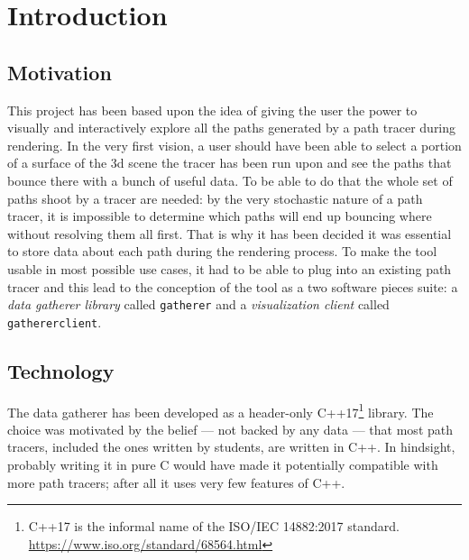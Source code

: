 \chapter{Introduction}

\section{Motivation}
\label{motivation}
This project has been based upon the idea of giving the user the power to visually and interactively explore all the paths generated by a path tracer during rendering. In the very first vision, a user should have been able to select a portion of a surface of the 3d scene the tracer has been run upon and see the paths that bounce there with a bunch of useful data. To be able to do that the whole set of paths shoot by a tracer are needed: by the very stochastic nature of a path tracer, it is impossible to determine which paths will end up bouncing where without resolving them all first. That is why it has been decided it was essential to store data about each path during the rendering process. To make the tool usable in most possible use cases, it had to be able to plug into an existing path tracer and this lead to the conception of the tool as a two software pieces suite: a \textit{data gatherer library} called \texttt{gatherer} and a \textit{visualization client} called \texttt{gathererclient}.


\section{Technology}
\label{technology}

The data gatherer has been developed as a header-only C++17\footnote{C++17 is the informal name of the ISO/IEC 14882:2017 standard. \url{https://www.iso.org/standard/68564.html}} library. The choice was motivated by the belief --- not backed by any data --- that most path tracers, included the ones written by students, are written in C++. In hindsight, probably writing it in pure C would have made it potentially compatible with more path tracers; after all it uses very few features of C++. 

